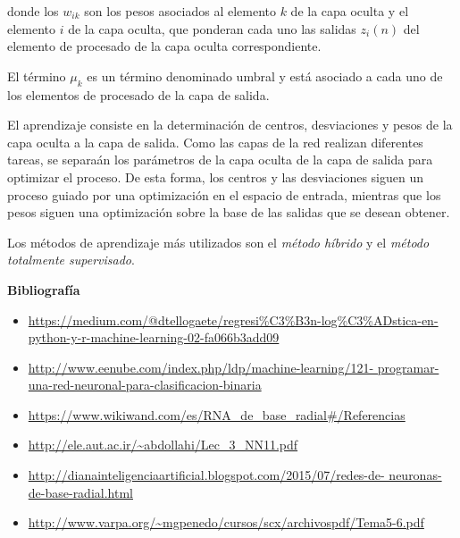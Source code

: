 \documentclass[letterpaper,11pt]{article}
\begin{document}
\begin{enumerate}
\begin{itemize}
        donde los $w_{ik}$ son los pesos asociados al elemento $k$ de la capa 
        oculta y el elemento $i$ de la capa oculta, que ponderan cada uno las 
        salidas $z_i (n)$ del elemento de procesado de la capa oculta 
        correspondiente. 

        El término $\mu_k$ es un término denominado umbral y está asociado a
        cada uno de los elementos de procesado de la capa de salida. 
    \end{itemize}

    El aprendizaje consiste en la determinación de centros, desviaciones y pesos 
    de la capa oculta a la capa de salida. Como las capas de la red realizan 
    diferentes tareas, se separaán los parámetros de la capa oculta de la capa 
    de salida para optimizar el proceso. De esta forma, los centros y las 
    desviaciones siguen un proceso guiado por una optimización en el espacio de 
    entrada, mientras que los pesos siguen una optimización sobre la base de las 
    salidas que se desean obtener. 

    Los métodos de aprendizaje más utilizados son el \textit{método híbrido} y
    el \textit{método totalmente supervisado}. 
\end{enumerate}

\textbf{Bibliografía}
\begin{itemize}
    \item \url{https://medium.com/@dtellogaete/regresi%
               python-y-r-machine-learning-02-fa066b3add09}
    \item \url{http://www.eenube.com/index.php/ldp/machine-learning/121-
               programar-una-red-neuronal-para-clasificacion-binaria}
    \item \url{https://www.wikiwand.com/es/RNA_de_base_radial#/Referencias}
    \item \url{http://ele.aut.ac.ir/~abdollahi/Lec_3_NN11.pdf}
    \item \url{http://dianainteligenciaartificial.blogspot.com/2015/07/redes-de-
               neuronas-de-base-radial.html}
    \item \url{http://www.varpa.org/~mgpenedo/cursos/scx/archivospdf/Tema5-6.pdf}
\end{itemize}
\end{document}

